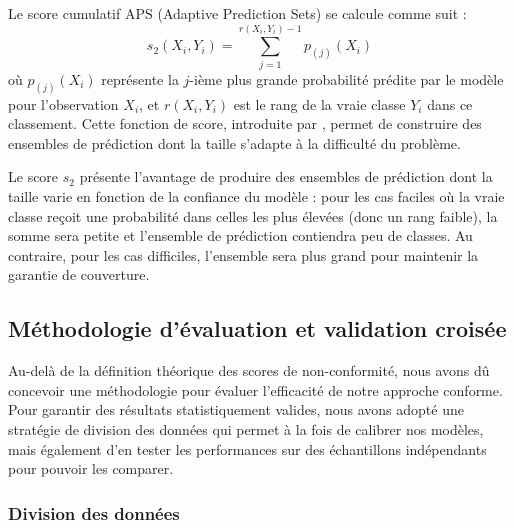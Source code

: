 \documentclass[a4paper,12pt]{article}
\begin{document}
\vspace{0.2cm}

Le score cumulatif APS (Adaptive Prediction Sets) se calcule comme suit : 
$$ s_2(X_i, Y_i) = \sum_{j=1}^{r(X_i, Y_i)-1} p_{(j)}(X_i) $$ où $p_{(j)}(X_i)$ représente la $j$-ième plus grande probabilité prédite par le modèle pour l'observation $X_i$, et $r(X_i, Y_i)$ est le rang de la vraie classe $Y_i$ dans ce classement. Cette fonction de score, introduite par \cite{Romano}, permet de construire des ensembles de prédiction dont la taille s'adapte à la difficulté du problème.

\vspace{0.2cm}

Le score $s_2$ présente l'avantage de produire des ensembles de prédiction dont la taille varie en fonction de la confiance du modèle : pour les cas faciles où la vraie classe reçoit une probabilité dans celles les plus élevées (donc un rang faible), la somme sera petite et l'ensemble de prédiction contiendra peu de classes. Au contraire, pour les cas difficiles, l'ensemble sera plus grand pour maintenir la garantie de couverture.


\subsection{Méthodologie d'évaluation et validation croisée}

Au-delà de la définition théorique des scores de non-conformité, nous avons dû concevoir une méthodologie pour évaluer l'efficacité de notre approche conforme. Pour garantir des résultats statistiquement valides, nous avons adopté une stratégie de division des données qui permet à la fois de calibrer nos modèles, mais également d'en tester les performances sur des échantillons indépendants pour pouvoir les comparer.

\subsubsection{Division des données}
\end{document}
